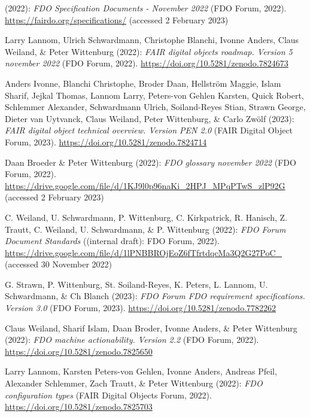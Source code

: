 \begin{thebibliography}{9}
(2022): \emph{{FDO Specification Documents - November 2022}} ({FDO
Forum}, 2022). \url{https://fairdo.org/specifications/} (accessed 2
February 2023)

Larry Lannom, Ulrich Schwardmann, Christophe Blanchi, Ivonne Anders,
Claus Weiland, \& Peter Wittenburg (2022): \emph{FAIR digital objects
roadmap. Version 5 november 2022} ({FDO Forum}, 2022).
\url{https://doi.org/10.5281/zenodo.7824673}

Anders Ivonne, Blanchi Christophe, Broder Daan, Hellström Maggie, Islam
Sharif, Jejkal Thomas, Lannom Larry, Peters-von Gehlen Karsten, Quick
Robert, Schlemmer Alexander, Schwardmann Ulrich, Soiland-Reyes Stian,
Strawn George, Dieter van Uytvanck, Claus Weiland, Peter Wittenburg, \&
Carlo Zwölf (2023): \emph{{FAIR} digital object technical overview.
Version PEN 2.0} ({FAIR Digital Object Forum}, 2023).
\url{https://doi.org/10.5281/zenodo.7824714}

Daan Broeder \& Peter Wittenburg (2022): \emph{{FDO} glossary november
2022} ({FDO Forum}, 2022).
\url{https://drive.google.com/file/d/1KJ9l0p96naKi_2HPJ_MPqPTwS_zlP92G}
(accessed 2 February 2023)

C. Weiland, U. Schwardmann, P. Wittenburg, C. Kirkpatrick, R. Hanisch,
Z. Trautt, C. Weiland, U. Schwardmann, \& P. Wittenburg (2022):
\emph{{FDO Forum Document Standards}} ({(internal draft)}: {FDO Forum},
2022).
\url{https://drive.google.com/file/d/1lPNBBROjEoZ6fTfrtdqcMa3Q2G27PoC_}
(accessed 30 November 2022)

G. Strawn, P. Wittenburg, St. Soiland-Reyes, K. Peters, L. Lannom, U.
Schwardmann, \& Ch Blanch (2023): \emph{{FDO Forum FDO} requirement
specifications. Version 3.0} ({FDO Forum}, 2023).
\url{https://doi.org/10.5281/zenodo.7782262}

Claus Weiland, Sharif Islam, Daan Broder, Ivonne Anders, \& Peter
Wittenburg (2022): \emph{{FDO} machine actionability. Version 2.2} ({FDO
Forum}, 2022).
\url{https://doi.org/10.5281/zenodo.7825650}

Larry Lannom, Karsten Peters-von Gehlen, Ivonne Anders, Andreas Pfeil,
Alexander Schlemmer, Zach Trautt, \& Peter Wittenburg (2022):
\emph{{FDO} configuration types} ({FAIR Digital Objects Forum}, 2022).
\url{https://doi.org/10.5281/zenodo.7825703}


\end{thebibliography}
